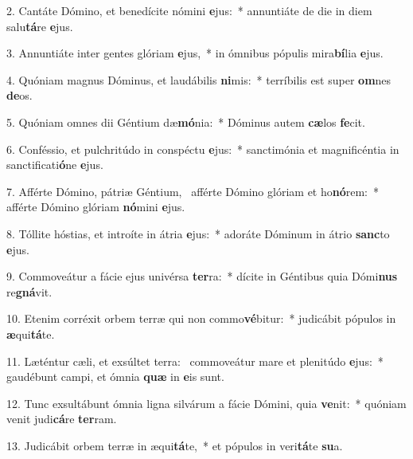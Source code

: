 2. Cantáte Dómino, et benedícite nómini \textbf{e}jus:~*  annuntiáte de die in diem salu\textbf{tá}re \textbf{e}jus.\

3. Annuntiáte inter gentes glóriam \textbf{e}jus,~*  in ómnibus pópulis mira\textbf{bí}lia \textbf{e}jus.\

4. Quóniam magnus Dóminus, et laudábilis \textbf{ni}mis:~*  terríbilis est super \textbf{om}nes \textbf{de}os.\

5. Quóniam omnes dii Géntium dæ\textbf{mó}nia:~*  Dóminus autem \textbf{cæ}los \textbf{fe}cit.\

6. Conféssio, et pulchritúdo in conspéctu \textbf{e}jus:~*  sanctimónia et magnificéntia in sanctificati\textbf{ó}ne \textbf{e}jus.\

7. Afférte Dómino, pátriæ Géntium, \dag\  afférte Dómino glóriam et ho\textbf{nó}rem:~*  afférte Dómino glóriam \textbf{nó}mini \textbf{e}jus.\

8. Tóllite hóstias, et introíte in átria \textbf{e}jus:~*  adoráte Dóminum in átrio \textbf{sanc}to \textbf{e}jus.\

9. Commoveátur a fácie ejus univérsa \textbf{ter}ra:~*  dícite in Géntibus quia Dómi\textbf{nus} re\textbf{gná}vit.\

10. Etenim corréxit orbem terræ qui non commo\textbf{vé}bitur:~*  judicábit pópulos in \textbf{æ}qui\textbf{tá}te.\

11. Læténtur cæli, et exsúltet terra: \dag\  commoveátur mare et plenitúdo \textbf{e}jus:~*  gaudébunt campi, et ómnia \textbf{quæ} in \textbf{e}is sunt.\

12. Tunc exsultábunt ómnia ligna silvárum a fácie Dómini, quia \textbf{ve}nit:~*  quóniam venit judi\textbf{cá}re \textbf{ter}ram.\

13. Judicábit orbem terræ in æqui\textbf{tá}te,~*  et pópulos in veri\textbf{tá}te \textbf{su}a.\

